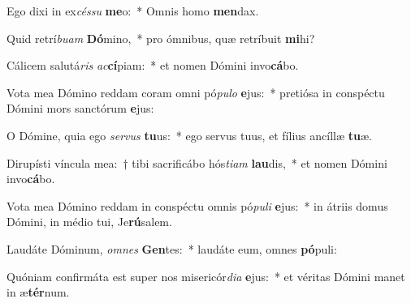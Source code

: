 \item Ego dixi in ex\textit{cés}\textit{su} \textbf{me}o:~* Omnis homo \textbf{men}dax.
\item Quid retrí\textit{bu}\textit{am} \textbf{Dó}mino,~* pro ómnibus, quæ retríbuit \textbf{mi}hi?
\item Cálicem salutá\textit{ris} \textit{ac}\textbf{cí}piam:~* et nomen Dómini invo\textbf{cá}bo.
\item Vota mea Dómino reddam coram omni pó\textit{pu}\textit{lo} \textbf{e}jus:~* pretiósa in conspéctu Dómini mors sanctórum \textbf{e}jus:
\item O Dómine, quia ego \textit{ser}\textit{vus} \textbf{tu}us:~* ego servus tuus, et fílius ancíllæ \textbf{tu}æ.
\item Dirupísti víncula mea:~† tibi sacrificábo hós\textit{ti}\textit{am} \textbf{lau}dis,~* et nomen Dómini invo\textbf{cá}bo.
\item Vota mea Dómino reddam in conspéctu omnis pó\textit{pu}\textit{li} \textbf{e}jus:~* in átriis domus Dómini, in médio tui, Je\textbf{rú}salem.
\item Laudáte Dóminum, \textit{om}\textit{nes} \textbf{Gen}tes:~* laudáte eum, omnes \textbf{pó}puli:
\item Quóniam confirmáta est super nos misericór\textit{di}\textit{a} \textbf{e}jus:~* et véritas Dómini manet in æ\textbf{tér}num.
